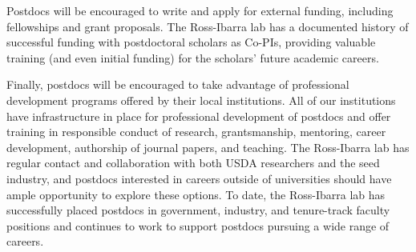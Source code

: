 Postdocs will be encouraged to write and apply for external funding, including fellowships and grant proposals.  The Ross-Ibarra lab has a documented history of successful funding with postdoctoral scholars as Co-PIs, providing valuable training (and even initial funding) for the scholars' future academic careers.

Finally, postdocs will be encouraged to take advantage of professional development programs offered by their local institutions. All of our institutions have infrastructure in place for professional development of postdocs and offer training in responsible conduct of research, grantsmanship, mentoring, career development, authorship of journal papers, and teaching. The Ross-Ibarra lab has regular contact and collaboration with both USDA researchers and the seed industry, and postdocs interested in careers outside of universities should have ample opportunity to explore these options.  To date, the Ross-Ibarra lab has successfully placed postdocs in government, industry, and tenure-track faculty positions and continues to work to support postdocs pursuing a wide range of careers.



